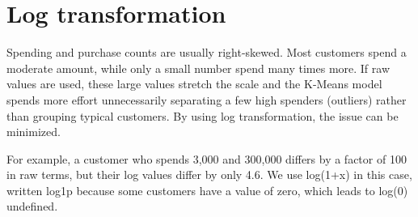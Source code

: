 \section{Log transformation}

Spending and purchase counts are usually right-skewed. Most customers spend a moderate amount, while only a small
number spend many times more. If raw values are used, these large values stretch the scale and the K-Means model spends
more effort unnecessarily separating a few high spenders (outliers) rather than grouping typical customers. By using
log transformation, the issue can be minimized.

For example, a customer who spends 3,000 and 300,000 differs by a factor of 100 in raw terms, but their log values
differ by only 4.6. We use log(1+x) in this case, written log1p because some customers have a value of zero, which
leads to log(0) undefined.

